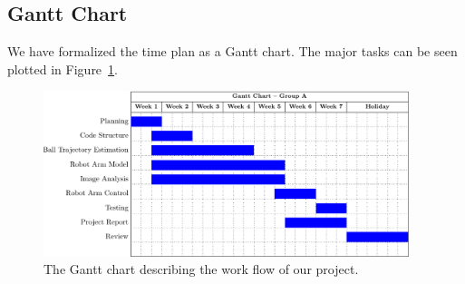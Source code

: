 \documentclass{article}
\begin{document}
\subsection{Gantt Chart}
    We have formalized the time plan as a Gantt chart. The major tasks can be seen plotted in Figure~\ref{fig:gantt}.
    \begin{figure}
        \centering
        \includegraphics[width=0.95\textwidth]{figures/gantt}
        \caption{The Gantt chart describing the work flow of our project.}
        \label{fig:gantt}
    \end{figure}
\end{document}
